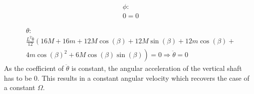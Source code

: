 \begin{equation}
    \begin{split}
        &\phi:\\
        &0 = 0
    \end{split}
\end{equation}

\begin{equation}
    \begin{split}
        &\theta:\\
        &\frac{L^2\mathrm{\ddot\theta}}{12}\left(16M+16m+12M\cos\left(\beta \right)+12M\sin\left(\beta \right)+12m\cos\left(\beta \right)+\right.\\
        &\left.4m{\cos\left(\beta \right)}^2+6M\cos\left(\beta \right)\sin\left(\beta \right)\right) = 0 \Rightarrow \ddot\theta = 0
    \end{split}
\end{equation}
As the coefficient of $\ddot\theta$ is constant, the angular acceleration of the vertical shaft has to be 0. This results in a constant angular velocity which recovers the case of a constant $\Omega$.

\subsection{}





    


